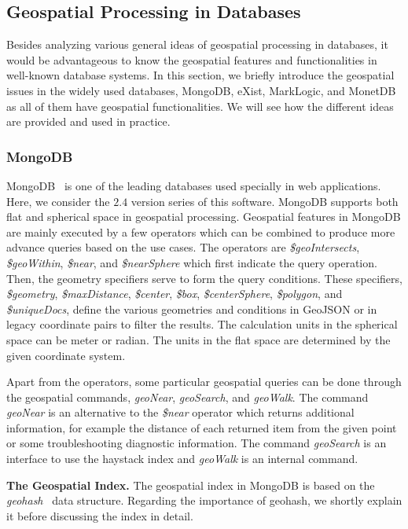 \documentclass[a4paper,12pt]{article}
\begin{document}
\subsection{Geospatial Processing in Databases} 
\label{s.dbs}
Besides analyzing various general ideas of geospatial processing in databases, it would be advantageous to know the geospatial features and functionalities in well-known database systems. In this section, we briefly introduce the geospatial issues in the widely used databases, MongoDB, eXist, MarkLogic, and MonetDB as all of them have geospatial functionalities. We will see how the different ideas are provided and used in practice.

\subsubsection{MongoDB}
\label{mongo}
MongoDB~\cite{mongogeneral2010,mongoinaction2011} is one of the leading databases used specially in web applications. Here, we consider the $2.4$ version series of this software. MongoDB supports both flat and spherical space in geospatial processing. Geospatial features in MongoDB are mainly executed by a few operators which can be combined to produce more advance queries based on the use cases. 
The operators are \textit{\$geoIntersects}, \textit{\$geoWithin}, \textit{\$near}, and \textit{\$nearSphere} which first indicate the query operation. Then, the geometry specifiers serve to form the query conditions. These specifiers, \textit{\$geometry}, \textit{\$maxDistance}, \textit{\$center}, \textit{\$box}, \textit{\$centerSphere}, \textit{\$polygon}, and \textit{\$uniqueDocs}, define the various geometries and conditions in GeoJSON or in legacy coordinate pairs to filter the results. The calculation units in the spherical space can be meter or radian. The units in the flat space are determined by the given coordinate system. 

Apart from the operators, some particular geospatial queries can be done through the geospatial commands, 
\textit{geoNear}, \textit{geoSearch}, and \textit{geoWalk}. The command \textit{geoNear} is an alternative to the \textit{\$near} operator which returns additional information, for example the distance of each returned item from the given point or some troubleshooting diagnostic information. The command \textit{geoSearch} is an interface to use the haystack index and \textit{geoWalk} is an internal command.

\textbf{The Geospatial Index.}
The geospatial index in MongoDB is based on the \textit{geohash}~\cite{www/geohash} data structure. Regarding the importance of geohash, we shortly explain it before discussing the index in detail.
\end{document}
